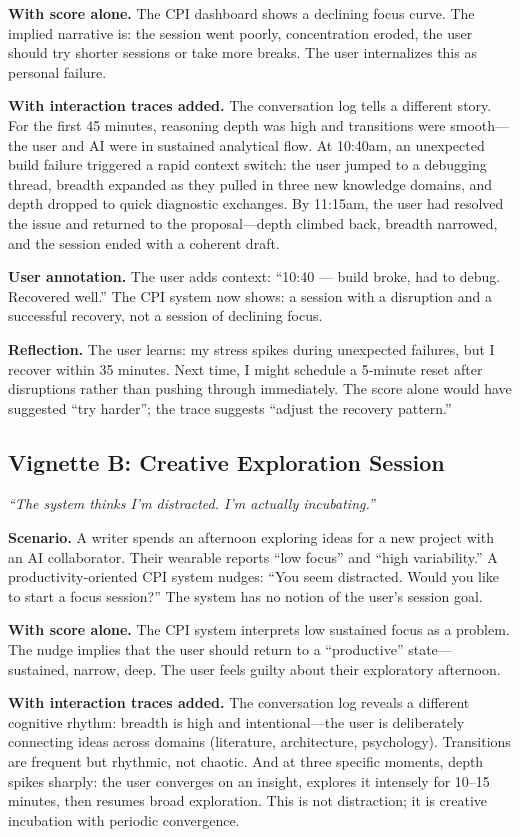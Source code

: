 \textbf{With score alone.} The CPI dashboard shows a declining focus curve. The implied narrative is: the session went poorly, concentration eroded, the user should try shorter sessions or take more breaks. The user internalizes this as personal failure.

\textbf{With interaction traces added.} The conversation log tells a different story. For the first 45 minutes, reasoning depth was high and transitions were smooth---the user and AI were in sustained analytical flow. At 10:40am, an unexpected build failure triggered a rapid context switch: the user jumped to a debugging thread, breadth expanded as they pulled in three new knowledge domains, and depth dropped to quick diagnostic exchanges. By 11:15am, the user had resolved the issue and returned to the proposal---depth climbed back, breadth narrowed, and the session ended with a coherent draft.

\textbf{User annotation.} The user adds context: ``10:40 --- build broke, had to debug. Recovered well.'' The CPI system now shows: a session with a disruption and a successful recovery, not a session of declining focus.

\textbf{Reflection.} The user learns: my stress spikes during unexpected failures, but I recover within 35 minutes. Next time, I might schedule a 5-minute reset after disruptions rather than pushing through immediately. The score alone would have suggested ``try harder''; the trace suggests ``adjust the recovery pattern.''

\subsection{Vignette B: Creative Exploration Session}

\textit{``The system thinks I'm distracted. I'm actually incubating.''}

\textbf{Scenario.} A writer spends an afternoon exploring ideas for a new project with an AI collaborator. Their wearable reports ``low focus'' and ``high variability.'' A productivity-oriented CPI system nudges: ``You seem distracted. Would you like to start a focus session?'' The system has no notion of the user's session goal.

\textbf{With score alone.} The CPI system interprets low sustained focus as a problem. The nudge implies that the user should return to a ``productive'' state---sustained, narrow, deep. The user feels guilty about their exploratory afternoon.

\textbf{With interaction traces added.} The conversation log reveals a different cognitive rhythm: breadth is high and intentional---the user is deliberately connecting ideas across domains (literature, architecture, psychology). Transitions are frequent but rhythmic, not chaotic. And at three specific moments, depth spikes sharply: the user converges on an insight, explores it intensely for 10--15 minutes, then resumes broad exploration. This is not distraction; it is creative incubation with periodic convergence.

